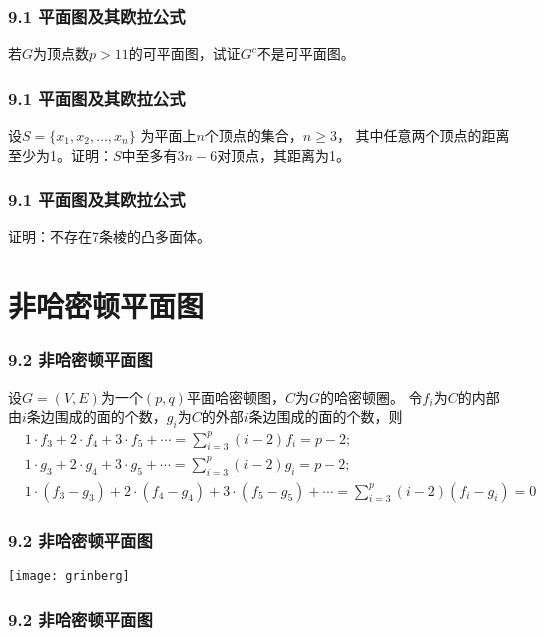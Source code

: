\documentclass{beamer}
\begin{document}
\begin{CJK}{UTF8}{gbsn}
\begin{frame}
  \frametitle{9.1 平面图及其欧拉公式}
  \begin{Exercise}
    若$G$为顶点数$p > 11$的可平面图，试证$G^c$不是可平面图。
  \end{Exercise}
\end{frame}
\begin{frame}
  \frametitle{9.1 平面图及其欧拉公式}
  \begin{Exercise}
    设$S = \{x_1, x_2, \ldots, x_n\}$ 为平面上$n$个顶点的集合，$n \geq 3$， 其中任意两个顶点的距离至少为1。证明：$S$中至多有$3n-6$对顶点，其距离为1。
  \end{Exercise}
\end{frame}
\begin{frame}
  \frametitle{9.1 平面图及其欧拉公式}
  \begin{Exercise}
    证明：不存在7条棱的凸多面体。
  \end{Exercise}
\end{frame}
\section{非哈密顿平面图}

\begin{frame}
  \frametitle{9.2 非哈密顿平面图}
  \begin{Thm}
    设$G=(V,E)$为一个$(p,q)$平面哈密顿图，$C$为$G$的哈密顿圈。
    令$f_i$为$C$的内部由$i$条边围成的面的个数，$g_i$为$C$的外部$i$条边围成的面的个数，则
    \begin{align}
      &1 \cdot f_3 + 2 \cdot f_4 + 3 \cdot f_5 + \cdots = \sum_{i=3}^p(i-2)f_i = p - 2;\\
      &1 \cdot g_3 + 2 \cdot g_4 + 3 \cdot g_5 + \cdots = \sum_{i=3}^p(i-2)g_i = p - 2;\\
      &1 \cdot (f_3 - g_3) + 2 \cdot (f_4 - g_4) + 3 \cdot (f_5 - g_5) + \cdots = \sum_{i=3}^p(i-2)(f_i - g_i) = 0
    \end{align}
  \end{Thm}
\end{frame}

\begin{frame}
  \frametitle{9.2 非哈密顿平面图}
  \centering
  \texttt{[image: grinberg]}
\end{frame}
\begin{frame}
  \frametitle{9.2 非哈密顿平面图}
  \centering
\end{frame}
\end{CJK}
\end{document}
